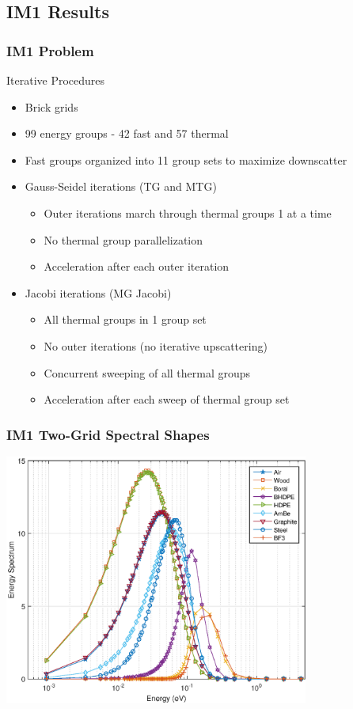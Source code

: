 \documentclass[compress,10pt]{beamer}
\begin{document}
\subsection{IM1 Results}
\begin{frame}[t]\frametitle{IM1 Problem}
\begin{block}{Iterative Procedures}
\begin{itemize}
	\item Brick grids
	\item 99 energy groups - 42 fast and 57 thermal
	\item Fast groups organized into 11 group sets to maximize downscatter
	\item Gauss-Seidel iterations (TG and MTG)
	\begin{itemize}
		\item Outer iterations march through thermal groups 1 at a time
		\item No thermal group parallelization
		\item Acceleration after each outer iteration
	\end{itemize}
	\item Jacobi iterations (MG Jacobi)
	\begin{itemize}
		\item All thermal groups in 1 group set
		\item No outer iterations (no iterative upscattering)
		\item Concurrent sweeping of all thermal groups
		\item Acceleration after each sweep of thermal group set
	\end{itemize}
\end{itemize}
\end{block}
\end{frame}
\begin{frame}[t]
\frametitle{IM1 Two-Grid Spectral Shapes}
\hspace*{1.1cm}
\includegraphics[width=0.75\textwidth]{images/IM1_EC_TG.eps}
\end{frame}
\end{document}
